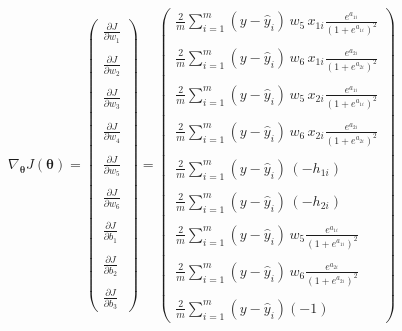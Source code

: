 \documentclass[
  a4paperpaper,
]{article}
\begin{document}
\begin{align}
  \nabla_{\boldsymbol{\theta}}J(\boldsymbol{\theta}) = \begin{pmatrix}
\frac{\partial J}{\partial w_1} \\ \\
\frac{\partial J}{\partial w_2} \\ \\
\frac{\partial J}{\partial w_3} \\ \\
\frac{\partial J}{\partial w_4} \\ \\
\frac{\partial J}{\partial w_5} \\ \\
\frac{\partial J}{\partial w_6} \\ \\
\frac{\partial J}{\partial b_1} \\ \\
\frac{\partial J}{\partial b_2} \\ \\
\frac{\partial J}{\partial b_3} \end{pmatrix} = \begin{pmatrix} 
\frac{2}{m} \sum\limits^m_{i = 1}(y - \hat{y}_i) \, w_5 \, x_{1i} \frac{e^{a_{1i}}}{(1+e^{a_{1i}})^2} \\ \\ 
\frac{2}{m} \sum\limits^m_{i = 1}(y - \hat{y}_i) \, w_6 \, x_{1i} \frac{e^{a_{2i}}}{(1+e^{a_{2i}})^2} \\ \\ 
\frac{2}{m} \sum\limits^m_{i = 1}(y - \hat{y}_i) \, w_5 \, x_{2i} \frac{e^{a_{1i}}}{(1+e^{a_{1i}})^2} \\ \\ 
\frac{2}{m} \sum\limits^m_{i = 1}(y - \hat{y}_i) \, w_6 \, x_{2i} \frac{e^{a_{2i}}}{(1+e^{a_{2i}})^2} \\ \\ 
\frac{2}{m} \sum\limits^m_{i = 1}(y - \hat{y}_i) \, (-h_{1i}) \\ \\ 
\frac{2}{m} \sum\limits^m_{i = 1}(y - \hat{y}_i) \, (-h_{2i}) \\ \\ 
\frac{2}{m} \sum\limits^m_{i = 1}(y - \hat{y}_i) \, w_5 \frac{e^{a_{1i}}}{(1+e^{a_{1i}})^2} \\ \\ 
\frac{2}{m} \sum\limits^m_{i = 1}(y - \hat{y}_i) \, w_6 \frac{e^{a_{2i}}}{(1+e^{a_{2i}})^2} \\ \\ 
\frac{2}{m} \sum\limits^m_{i = 1}(y - \hat{y}_i)(-1)
\end{pmatrix} \label{102}
\end{align}  
\end{document}
